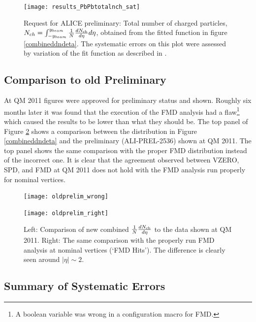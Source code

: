 \documentclass[11pt]{article}
\begin{document}
\begin{figure}
  \centering
  \texttt{[image: results\_PbPbtotalnch\_sat]}
  \caption{Request for ALICE preliminary: Total number of charged
    particles, $N_{ch}=\int^{y_{beam}}_{-y_{beam}}\dndeta d\eta$,
    obtained from the fitted function in figure
    \ref{combineddndeta}. The systematic errors on this plot were
    assessed by variation of the fit function as described in \cite{maxime}.}
  \label{totalNch}
\end{figure} 

\subsection{Comparison to old Preliminary}

At QM 2011 figures were approved for preliminary status and
shown. Roughly six months later it was found that the execution of the
FMD analysis had a flaw\footnote{A boolean variable was wrong in a
  configuration macro for FMD.} which caused the results to be lower
than what they should be. The top panel of Figure
\ref{prelimcomparison} shows a comparison between the distribution in
Figure \ref{combineddndeta} and the preliminary (ALI-PREL-2536) shown
at QM 2011. The top panel shows the same comparison with the proper
FMD distribution instead of the incorrect one. It is clear that the
agreement observed between VZERO, SPD, and FMD at QM 2011 does not
hold with the FMD analysis run properly for nominal vertices.

\begin{figure}
  \centering
  \begin{minipage}{0.5\linewidth}
    \centering
    \texttt{[image: oldprelim\_wrong]}
  \end{minipage}%
  \begin{minipage}{0.5\linewidth}
    \centering
    \texttt{[image: oldprelim\_right]}
  \end{minipage}%
  \caption{Left: Comparison of new combined $\dndeta$ to the data
    shown at QM 2011. Right: The same comparison with the properly run
    FMD analysis at nominal vertices (`FMD Hits'). The difference is
    clearly seen around $|\eta| \sim 2$.}
  \label{prelimcomparison}
\end{figure} 

\subsection{Summary of Systematic Errors}
\end{document}
